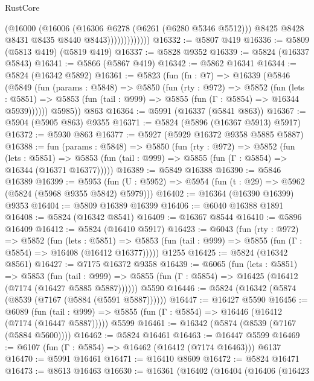 \begin{lexlean}{RustCore}
\begin{coremodule}
                          (@16000
                            (@16006
                              (@16306 @6278 (@6261 (@6280 @5346 @5512)))
                              @8425
                              @8428
                              @8431
                              @8435
                              @8440
                              @8443)))))))))))))
@16332 := @5807 @419
@16336 := @5809 (@5813 @419) (@5819 @419)
@16337 := @5828 @9352
@16339 := @5824 (@16337 @5843)
@16341 := @5866 (@5867 @419)
@16342 := @5862 @16341
@16344 := @5824 (@16342 @5892)
@16361 := @5823
    (fun (fn : @7) =>
    @16339
      (@5846
        (@5849
          (fun (params : @5848) =>
          @5850
            (fun (rty : @972) =>
            @5852
              (fun (lets : @5851) =>
              @5853 (fun (tail : @999) => @5855 (fun (Γ : @5854) => @16344 @5939))))))
        @5985))
    @863
@16364 := @5991 (@16337 (@5841 @863))
@16367 := @5904 (@5905 @863) @9355
@16371 := @5824 (@5896 (@16367 @5913) @5917)
@16372 := @5930 @863
@16377 := @5927 (@5929 @16372 @9358 @5885 @5887)
@16388 := fun (params : @5848) =>
  @5850
    (fun (rty : @972) =>
    @5852
      (fun (lets : @5851) =>
      @5853 (fun (tail : @999) => @5855 (fun (Γ : @5854) => @16344 (@16371 @16377)))))
@16389 := @5849 @16388
@16390 := @5846 @16389
@16399 := @5953
    (fun (U : @5952) => @5954 (fun (t : @29) => @5962 (@5824 (@5968 @9355 @5842) @5979)))
@16402 := @16364 (@16390 @16399) @9353
@16404 := @5809 @16389 @16399
@16406 := @6040 @16388 @1891
@16408 := @5824 (@16342 @8541)
@16409 := @16367 @8544
@16410 := @5896 @16409
@16412 := @5824 (@16410 @5917)
@16423 := @6043
    (fun (rty : @972) =>
    @5852
      (fun (lets : @5851) =>
      @5853 (fun (tail : @999) => @5855 (fun (Γ : @5854) => @16408 (@16412 @16377)))))
    @1255
@16425 := @5824 (@16342 @8561)
@16427 := @7175 @16372 @9358
@16439 := @6065
    (fun (lets : @5851) =>
    @5853
      (fun (tail : @999) =>
      @5855 (fun (Γ : @5854) => @16425 (@16412 (@7174 (@16427 @5885 @5887))))))
    @5590
@16446 := @5824 (@16342 (@5874 (@8539 (@7167 (@5884 (@5591 @5887))))))
@16447 := @16427 @5590
@16456 := @6089
    (fun (tail : @999) => @5855 (fun (Γ : @5854) => @16446 (@16412 (@7174 (@16447 @5887)))))
    @5599
@16461 := @16342 (@5874 (@8539 (@7167 (@5884 @5600))))
@16462 := @5824 @16461
@16463 := @16447 @5599
@16469 := @6107 (fun (Γ : @5854) => @16462 (@16412 (@7174 @16463))) @6137
@16470 := @5991 @16461
@16471 := @16410 @8609
@16472 := @5824 @16471
@16473 := @8613 @16463
@16630 := @16361
    (@16402
      (@16404
        (@16406
          (@16423

\end{coremodule}
\end{lexlean}
